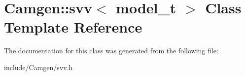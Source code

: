 \hypertarget{a00519}{\section{Camgen\-:\-:svv$<$ model\-\_\-t $>$ Class Template Reference}
\label{a00519}
}


The documentation for this class was generated from the following file\-:\begin{DoxyCompactItemize}
\item 
include/\-Camgen/svv.\-h\end{DoxyCompactItemize}
